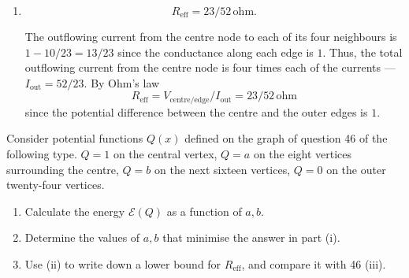 \documentclass[12 pt, letterpaper]{hmcpset}
\begin{document}
\begin{solution}
\begin{enumerate}
			The values of $f$ are the probability that a random walk starting at that vertex would hit the centre node before hitting the outer edge. Thus, the probability that a random walk starting at the centre vertex hits the outer edge before returning to the centre is the sum (over all neighbours of the centre) of probabilities that a random walk starting at that neighbour hits the outer edge before hitting the centre weighted by the probability that the neighbour is the second vertex of the random walk.

			Each neighbour has the same probability of being the second vertex, and the same probability of return to the centre ($10 / 23$). Thus, the probability of escape to the outer edge is $13 / 23$.

		\item 
			\[
				\boxed{
					R_{\text{eff}} = 23 / 52 \, \mathrm{ohm}.
				}
			\]

			The outflowing current from the centre node to each of its four neighbours is $1 - 10/23 = 13 / 23$ since the conductance along each edge is $1$. Thus, the total outflowing current from the centre node is four times each of the currents --- $I_{\text{out}} = 52 / 23$. By Ohm's law
			\[
				R_{\text{eff}} = V_{\text{centre/edge}} / I_{\text{out}} = 23/52 \, \mathrm{ohm}
			\]
			since the potential difference between the centre and the outer edges is $1$.
	\end{enumerate}
\end{solution}

\pagebreak

\begin{problem}[47.]
	Consider potential functions $Q(x)$ defined on the graph of question 46 of the following type. $Q = 1$ on the central vertex, $Q = a$ on the eight vertices surrounding the centre, $Q = b$ on the next sixteen vertices, $Q = 0$ on the outer twenty-four vertices.
	\begin{enumerate}
		\item Calculate the energy $\mathcal{E}(Q)$ as a function of $a, b$.

		\item Determine the values of $a, b$ that minimise the answer in part (i).

		\item Use (ii) to write down a lower bound for $R_{\text{eff}}$, and compare it with 46 (iii).
	\end{enumerate}
\end{problem}
\end{document}
